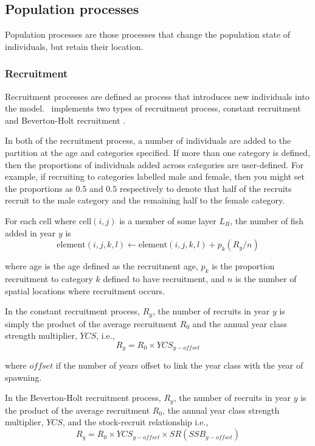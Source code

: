 \subsection{Population processes}

Population processes are those processes that change the population state of individuals, but retain their location. 

\subsubsection{Recruitment}

Recruitment processes are defined as  process that introduces new individuals into the model. \SPM\ implements two types of recruitment process, constant recruitment and Beverton-Holt recruitment \citep{1203}. 

In both of the recruitment process, a number of individuals are added to the partition at the age and categories specified. If more than one category is defined, then the proportions of individuals added across categories are user-defined. For example, if recruiting to categories labelled male and female, then you might set the proportions as $0.5$ and $0.5$ respectively to denote that half of the recruits recruit to the male category and the remaining half to the female category.

For each cell where cell$(i,j)$ is a member of some layer $L_R$, the  number of fish added in year $y$ is 
\begin{equation}
  \text{element}(i,j,k,l) \leftarrow \text{element}(i,j,k,l) + p_k(R_y / n)
\end{equation}

where age is the age defined as the recruitment age, $p_k$ is the proportion recruitment to category $k$ defined to have recruitment, and $n$ is the number of spatial locations where recruitment occurs. 

In the constant recruitment process, $R_y$, the number of recruits in year $y$ is simply the product of the average recruitment $R_0$ and the annual year class strength multiplier, $YCS$, i.e.,
\begin{equation}
  R_y = R_0 \times YCS_{y-offset}
\end{equation}

where $offset$ if the number of years offset to link the year class with the year of spawning.

In the Beverton-Holt recruitment process, $R_y$, the number of recruits in year $y$ is the product of the average recruitment $R_0$, the annual year class strength multiplier, $YCS$, and the stock-recruit relationship i.e.,
\begin{equation}
  R_y = R_0 \times YCS_{y-offset} \times SR(SSB_{y-offset})
\end{equation}

